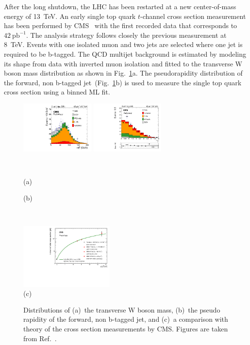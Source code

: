 \documentclass{PoS}
\begin{document}
After the long shutdown, the LHC has been restarted at a new center-of-mass energy of 13~TeV. An early single top quark $t$-channel cross section measurement has been performed by CMS~\cite{CMS-PAS-TOP-15-004} with the first recorded data that corresponds to $42~\mathrm{pb}^{-1}$.
The analysis strategy follows closely the previous measurement at 8~TeV. Events with one isolated muon and two jets are selected where one jet is required to be b-tagged. The QCD multijet background is estimated by modeling its shape from data with inverted muon isolation and fitted to the transverse W boson mass distribution as shown in Fig.~\ref{fig:singletop13}a. The pseudorapidity distribution of the forward, non b-tagged jet~(Fig.~\ref{fig:singletop13}b) is used to measure the single top quark cross section using a binned ML fit.
\begin{figure}[htbp]
\begin{center}
\parbox[t]{0.34\textwidth}{\centering\includegraphics[width=0.33\textwidth]{cms_xsec13/mtw.pdf}}
\parbox[t]{0.34\textwidth}{\centering\includegraphics[width=0.33\textwidth]{cms_xsec13/mu2j1t.pdf}}\\
\parbox[t]{0.34\textwidth}{\centering (a)}
\parbox[t]{0.34\textwidth}{\centering (b)}\\\medskip
\parbox[t]{0.99\textwidth}{\centering\includegraphics[width=0.42\textwidth]{cms_xsec13/xsec.pdf}\\(c)}
\end{center}
\caption{\label{fig:singletop13}Distributions of (a)~the transverse W boson mass, (b)~the pseudo rapidity of the forward, non b-tagged jet, and (c)~a comparison with theory of the cross section measurements by CMS. Figures are taken from Ref.~\cite{CMS-PAS-TOP-15-004}.}
\end{figure}
\end{document}
